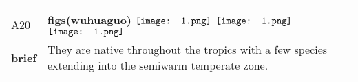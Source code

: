 \documentclass[UTF8]{article}
\begin{document}
            \begin{tabularx}{\textwidth}{p{1.5cm}X}
            \arrayrulecolor{myBlue}
        	\hline\\
            \small{A20}&
            \large{\bfseries{figs(wuhuaguo)}}\hfill
                                                            $\vcenter{\hbox{\texttt{[image: 1.png]}}}$
                                                                \phantom{$\vcenter{\hbox{\texttt{[image: 1.png]}}}$}
                                                                $\vcenter{\hbox{\texttt{[image: 1.png]}}}$
                                                                \phantom{$\vcenter{\hbox{\texttt{[image: 1.png]}}}$}
                                                                \phantom{$\vcenter{\hbox{\texttt{[image: 1.png]}}}$}
                                                                $\vcenter{\hbox{\texttt{[image: 1.png]}}}$
                                                                \phantom{$\vcenter{\hbox{\texttt{[image: 1.png]}}}$}
                                        \\[10pt]
            \large{\bfseries{brief}}&\noindent\parbox[c]{\hsize}{They are native throughout the tropics with a few species extending into the semiwarm temperate zone.} \\[5pt]
            \hline\\[-10pt]
        \end{tabularx}
\end{document}
